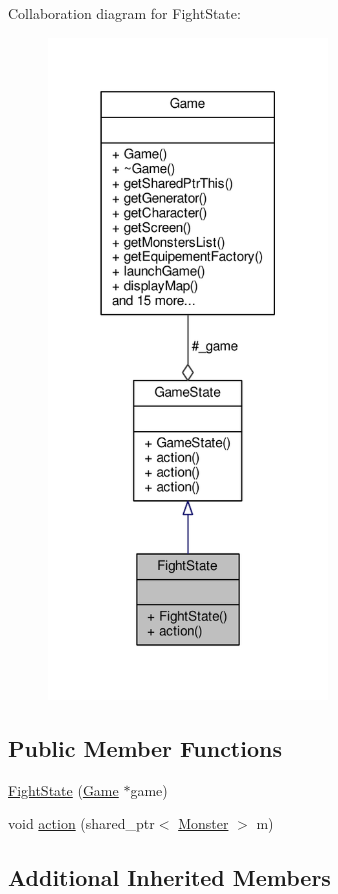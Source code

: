 Collaboration diagram for Fight\-State\-:
\nopagebreak
\begin{figure}[H]
\begin{center}
\leavevmode
\includegraphics[width=210pt]{class_fight_state__coll__graph}
\end{center}
\end{figure}
\subsection*{Public Member Functions}
\begin{DoxyCompactItemize}
\item 
\hyperlink{class_fight_state_ae83f0444fb40ade6a3f37dfd1d4f668b}{Fight\-State} (\hyperlink{class_game}{Game} $\ast$game)
\item 
void \hyperlink{class_fight_state_af27ec5d07802ad3fcc7e17c1a6dd9891}{action} (shared\-\_\-ptr$<$ \hyperlink{class_monster}{Monster} $>$ m)
\end{DoxyCompactItemize}
\subsection*{Additional Inherited Members}


